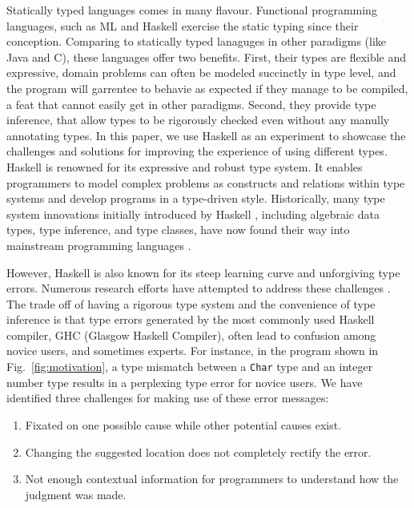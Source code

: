\documentclass[pdflatex,sn-mathphys-num]{sn-jnl}%
\begin{document}
Statically typed languages comes in many flavour. Functional programming languages, such as ML and Haskell exercise the static typing since their conception. Comparing to statically typed lanaguges in other paradigms (like Java and C), these languages offer two benefits. First, their types are flexible and expressive, domain problems can often be modeled succinctly in type level, and the program will garrentee to behavie as expected if they manage to be compiled, a feat that cannot easily get in other paradigms. Second, they provide type inference, that allow types to be rigorously checked even without any manully annotating types. In this paper, we use Haskell as an experiment to showcase the challenges and solutions for improving the experience of using different types. Haskell is renowned for its expressive and robust type system. It enables programmers to model complex problems as constructs and relations within type systems and develop programs in a type-driven style. Historically, many type system innovations initially introduced by Haskell \cite{Hudak2007-kn}, including algebraic data types, type inference, and type classes, have now found their way into mainstream programming languages \cite{TypeScriptTeam_undated-qk,Klabnik_undated-mp,Griesemer_undated-ff}.

    
However, Haskell is also known for its steep learning curve and unforgiving type errors. Numerous research efforts have attempted to address these challenges \cite{Tirronen2015-nr,Chen2014-dz, Heeren2003-kd,Zhang2015-xy, Lerner2007-mu,Zhang2017-tj}. The trade off of having a rigorous type system and the convenience of type inference is that type errors generated by the most commonly used Haskell compiler, GHC (Glasgow Haskell Compiler), often lead to confusion among novice users, and sometimes experts. For instance, in the program shown in Fig.~\ref{fig:motivation}, a type mismatch between a {\tt Char} type and an integer number type results in a perplexing type error for novice users. We have identified three challenges for making use of these error messages:

    \begin{enumerate}
        \item Fixated on one possible cause while other potential causes exist.
        \item Changing the suggested location does not completely rectify the error.
        \item Not enough contextual information for programmers to understand how the judgment was made.

    \end{enumerate}
\end{document}
